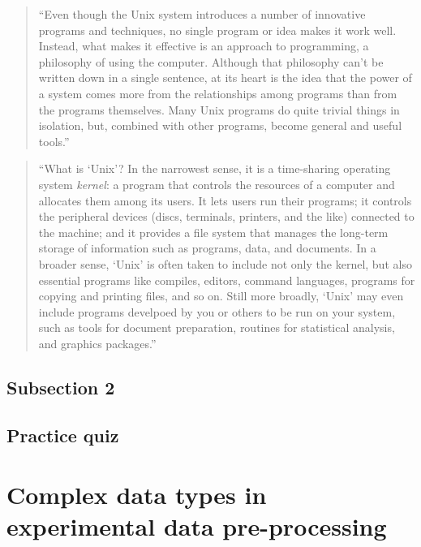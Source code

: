 \documentclass[]{tufte-book}
\begin{document}
\begin{quote}
``Even though the Unix system introduces a number of innovative programs and techniques,
no single program or idea makes it work well. Instead, what makes it effective is an approach
to programming, a philosophy of using the computer. Although that philosophy can't be written
down in a single sentence, at its heart is the idea that the power of a system comes more from
the relationships among programs than from the programs themselves. Many Unix programs do
quite trivial things in isolation, but, combined with other programs, become general and
useful tools.'' \citep{kernighan1984unix}
\end{quote}

\begin{quote}
``What is `Unix'? In the narrowest sense, it is a time-sharing operating system \emph{kernel}:
a program that controls the resources of a computer and allocates them among its users.
It lets users run their programs; it controls the peripheral devices (discs, terminals,
printers, and the like) connected to the machine; and it provides a file system that
manages the long-term storage of information such as programs, data, and documents.
In a broader sense, `Unix' is often taken to include not only the kernel, but also
essential programs like compiles, editors, command languages, programs for copying and
printing files, and so on. Still more broadly, `Unix' may even include programs
develpoed by you or others to be run on your system, such as tools for document
preparation, routines for statistical analysis, and graphics packages.'' \citep{kernighan1984unix}
\end{quote}

\hypertarget{subsection-2-8}{%
\subsection{Subsection 2}\label{subsection-2-8}}

\hypertarget{practice-quiz-2}{%
\subsection{Practice quiz}\label{practice-quiz-2}}

\hypertarget{complex-data-types-in-experimental-data-pre-processing}{%
\section{Complex data types in experimental data pre-processing}\label{complex-data-types-in-experimental-data-pre-processing}}
\end{document}
